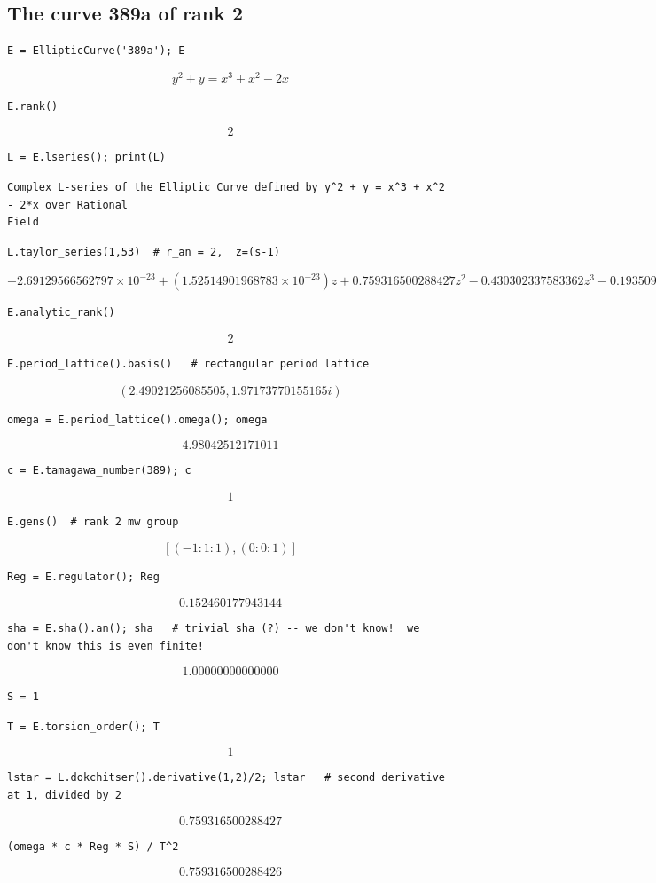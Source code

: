 \documentclass{book}
\begin{document}
\begin{lstlisting}
\end{lstlisting}\subsection{The curve 389a of rank 2}


\begin{lstlisting}
E = EllipticCurve('389a'); E
\end{lstlisting}$$y^2 + y = x^{3} + x^{2} - 2 x $$
\begin{lstlisting}
E.rank()
\end{lstlisting}$$2$$
\begin{lstlisting}
L = E.lseries(); print(L)
\end{lstlisting}\begin{verbatim}Complex L-series of the Elliptic Curve defined by y^2 + y = x^3 + x^2 - 2*x over Rational
Field\end{verbatim}
\begin{lstlisting}
L.taylor_series(1,53)  # r_an = 2,  z=(s-1)
\end{lstlisting}$$-2.69129566562797 \times 10^{-23} + \left(1.52514901968783 \times 10^{-23}\right)z + 0.759316500288427z^{2} - 0.430302337583362z^{3} - 0.193509313829981z^{4} + 0.459971558373642z^{5} + O(z^{6})$$
\begin{lstlisting}
E.analytic_rank()
\end{lstlisting}$$2$$
\begin{lstlisting}
E.period_lattice().basis()   # rectangular period lattice
\end{lstlisting}$$\left(2.49021256085505, 1.97173770155165i\right)$$
\begin{lstlisting}
omega = E.period_lattice().omega(); omega
\end{lstlisting}$$4.98042512171011$$
\begin{lstlisting}
c = E.tamagawa_number(389); c
\end{lstlisting}$$1$$
\begin{lstlisting}
E.gens()  # rank 2 mw group
\end{lstlisting}$$\left[\left(-1 : 1 : 1\right), \left(0 : 0 : 1\right)\right]$$
\begin{lstlisting}
Reg = E.regulator(); Reg
\end{lstlisting}$$0.152460177943144$$
\begin{lstlisting}
sha = E.sha().an(); sha   # trivial sha (?) -- we don't know!  we don't know this is even finite!
\end{lstlisting}$$1.00000000000000$$
\begin{lstlisting}
S = 1
\end{lstlisting}
\begin{lstlisting}
T = E.torsion_order(); T
\end{lstlisting}$$1$$
\begin{lstlisting}
lstar = L.dokchitser().derivative(1,2)/2; lstar   # second derivative at 1, divided by 2
\end{lstlisting}$$0.759316500288427$$
\begin{lstlisting}
(omega * c * Reg * S) / T^2
\end{lstlisting}$$0.759316500288426$$
\end{document}
